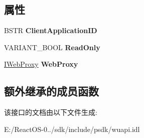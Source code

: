 \subsection*{属性}
\begin{DoxyCompactItemize}
\item 
\mbox{\label{interface_w_u_api_lib_1_1_i_update_session_a5a063e0c7c9391da743d986eeb713017}} 
B\+S\+TR {\bfseries Client\+Application\+ID}
\item 
\mbox{\label{interface_w_u_api_lib_1_1_i_update_session_a07d96490ad78e3edcf85742214233c65}} 
V\+A\+R\+I\+A\+N\+T\+\_\+\+B\+O\+OL {\bfseries Read\+Only}
\item 
\mbox{\label{interface_w_u_api_lib_1_1_i_update_session_adb0fdf9bdfc00c22291cffc0b467e16e}} 
\hyperlink{interface_w_u_api_lib_1_1_i_web_proxy}{I\+Web\+Proxy} {\bfseries Web\+Proxy}
\end{DoxyCompactItemize}
\subsection*{额外继承的成员函数}


该接口的文档由以下文件生成\+:\begin{DoxyCompactItemize}
\item 
E\+:/\+React\+O\+S-\/0../sdk/include/psdk/wuapi.\+idl\end{DoxyCompactItemize}
